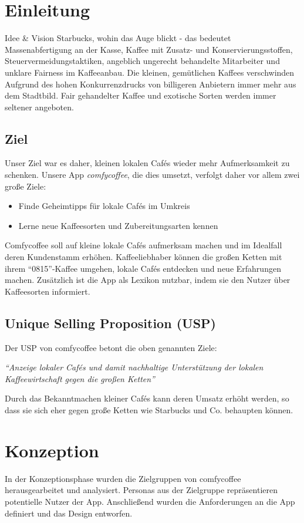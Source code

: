 \chapter{Einleitung}
\label{einleitung}
Idee & Vision
Starbucks, wohin das Auge blickt - das bedeutet Massenabfertigung an der Kasse, Kaffee mit Zusatz- und Konservierungsstoffen, Steuervermeidungstaktiken, angeblich ungerecht behandelte Mitarbeiter und unklare Fairness im Kaffeeanbau. Die kleinen, gemütlichen Kaffees verschwinden Aufgrund des hohen Konkurrenzdrucks von billigeren Anbietern immer mehr aus dem Stadtbild. Fair gehandelter Kaffee und exotische Sorten werden immer seltener angeboten.

\section{Ziel}
Unser Ziel war es daher, kleinen lokalen Cafés wieder mehr Aufmerksamkeit zu schenken. Unsere App \emph{comfycoffee}, die dies umsetzt, verfolgt daher vor allem zwei große Ziele:
\begin{itemize}
	\item Finde Geheimtipps für lokale Cafés im Umkreis
	\item Lerne neue Kaffeesorten und Zubereitungsarten kennen
\end{itemize}
Comfycoffee soll auf kleine lokale Cafés aufmerksam machen und im Idealfall deren Kundenstamm erhöhen. Kaffeeliebhaber können die großen Ketten mit ihrem ``0815''-Kaffee umgehen, lokale Cafés entdecken und neue Erfahrungen machen. Zusätzlich ist die App als Lexikon nutzbar, indem sie den Nutzer über Kaffeesorten informiert. 

\section{Unique Selling Proposition (USP)}
Der USP von comfycoffee betont die oben genannten Ziele:

\emph{``Anzeige lokaler Cafés und damit nachhaltige Unterstützung der lokalen Kaffeewirtschaft gegen die großen Ketten''}

Durch das Bekanntmachen kleiner Cafés kann deren Umsatz erhöht werden, so dass sie sich eher gegen große Ketten wie Starbucks und Co. behaupten können.

\chapter{Konzeption}
\label{konzeption}
In der Konzeptionsphase wurden die Zielgruppen von comfycoffee herausgearbeitet und analysiert. Personas aus der Zielgruppe repräsentieren potentielle Nutzer der App. Anschließend wurden die Anforderungen an die App definiert und das Design entworfen.

